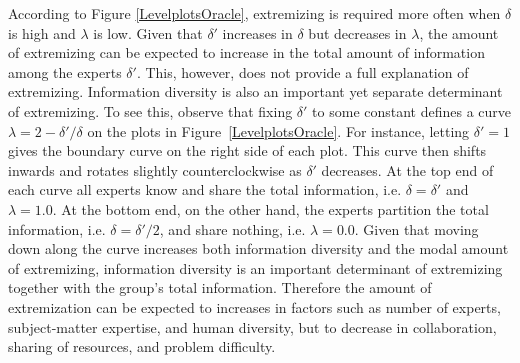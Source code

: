 \documentclass[11pt]{article}
\newtheorem{observation}[theorem]{Observation}
\theoremstyle{definition}
\theoremstyle{definition}
\begin{document}
According to Figure \ref{LevelplotsOracle}, extremizing is required 
more often when $\delta$ is high and $\lambda$ is low.  Given that 
$\delta'$ increases in $\delta$ but decreases in $\lambda$, the amount 
of extremizing can be expected to increase in the total amount of 
information among the experts $\delta'$.  This, however, does not 
provide a full explanation of extremizing.  Information diversity 
is also an important yet separate determinant of extremizing.  
To see this, observe that fixing $\delta'$ to some constant 
defines a curve $\lambda = 2 - \delta'/\delta$ on the plots in 
Figure~\ref{LevelplotsOracle}.  For instance, letting $\delta' = 1$ 
gives the boundary curve on the right side of each plot.  This curve 
then shifts inwards and rotates slightly counterclockwise as 
$\delta'$ decreases.  At the top end of each curve all experts 
know and share the total information, i.e. $\delta = \delta'$ and 
$\lambda = 1.0$.  At the bottom end, on the other hand, the experts 
partition the total information, i.e. $\delta = \delta'/2$, and 
share nothing, i.e. $\lambda = 0.0$.  Given that moving down along 
the curve increases both information diversity and the modal amount 
of extremizing, information diversity is an important determinant 
of extremizing together with the group's total information.  
Therefore the amount of extremization can be expected to increases in factors such as number of experts, subject-matter expertise, and human diversity, but to decrease in collaboration, sharing of resources, and problem difficulty.

\end{document}
